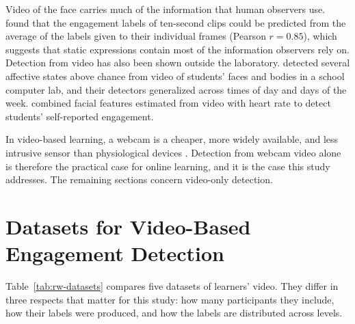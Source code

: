 Video of the face carries much of the information that human observers use.  found that the engagement labels of ten-second clips could be predicted from the average of the labels given to their individual frames (Pearson $r = 0.85$), which suggests that static expressions contain most of the information observers rely on. Detection from video has also been shown outside the laboratory.  detected several affective states above chance from video of students' faces and bodies in a school computer lab, and their detectors generalized across times of day and days of the week.  combined facial features estimated from video with heart rate to detect students' self-reported engagement.

In video-based learning, a webcam is a cheaper, more widely available, and less intrusive sensor than physiological devices \cite{abedi2021}. Detection from webcam video alone is therefore the practical case for online learning, and it is the case this study addresses. The remaining sections concern video-only detection.



\section{Datasets for Video-Based Engagement Detection}
\label{sec:rw-datasets}

Table~\ref{tab:rw-datasets} compares five datasets of learners' video. They differ in three respects that matter for this study: how many participants they include, how their labels were produced, and how the labels are distributed across levels.

